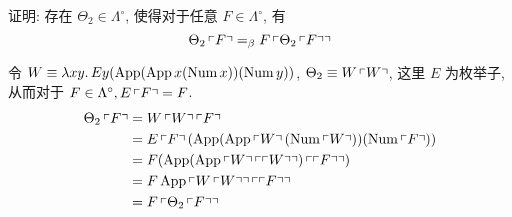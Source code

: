 \begin{problem}
证明: 存在 $\Theta_2 \in \Lambda^\circ$, 使得对于任意 $F \in \Lambda^\circ$, 有
\[
\Theta_2 \numeral{F} =_\beta F \numeral{\Theta_2 \numeral{F}}
\]
\end{problem}

\begin{solution}
令 $W \equiv \lambdabstract{xy}{E y (\operatorname{App} (\operatorname{App} x (\operatorname{Num} x)) (\operatorname{Num} y))}$, $\Theta_2 \equiv W \numeral{W}$, 这里 $E$ 为枚举子, 从而对于 $F \in \Lambda^\circ, E \numeral{F} = F$.
\begin{align*}
\Theta_2 \numeral{F} & = W \numeral{W} \numeral{F} \\
& = E \numeral{F} (\operatorname{App} (\operatorname{App} \numeral{W} (\operatorname{Num} \numeral{W})) (\operatorname{Num} \numeral{F})) \\
& = F (\operatorname{App} (\operatorname{App} \numeral{W} \numeral{\numeral{W}}) \numeral{\numeral{F}}) \\
& = F \operatorname{App} \numeral{W \numeral{W}} \numeral{\numeral{F}} \\
& = F \numeral{\Theta_2 \numeral{F}}
\end{align*}
\end{solution}

